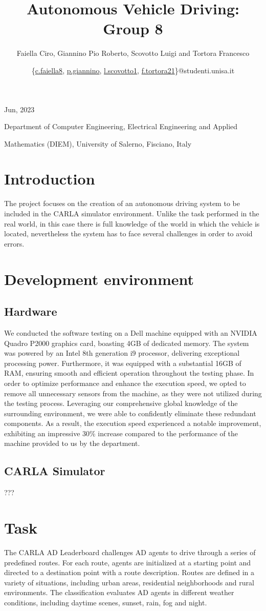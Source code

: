 \documentclass{article}
\title{\textbf{\myfont Autonomous Vehicle Driving: Group 8}}
\author{\small{Faiella Ciro, Giannino Pio Roberto, Scovotto Luigi and Tortora Francesco}}
\date{\small{\{\href{mailto:c.faiella8@studenti.unisa.it}{c.faiella8}, \href{mailto:p.giannino@studenti.unisa.it}{p.giannino}, \href{mailto:l.scovotto1@studenti.unisa.it}{l.scovotto1}, \href{mailto:f.tortora21@studenti.unisa.it}{f.tortora21}\}@studenti.unisa.it}}
\begin{document}
\maketitle
\centerline{\small{Jun, 2023}}
\centerline{Department of Computer Engineering, Electrical Engineering and Applied}
\centerline{Mathematics (DIEM), University of Salerno, Fisciano, Italy}


\section{Introduction}
The project focuses on the creation of an autonomous driving system to be included in the CARLA simulator 
environment. Unlike the task performed in the real world, in this case there is full knowledge of the world 
in which the vehicle is located, nevertheless the system has to face several challenges in order to avoid 
errors. 

\section{Development environment}
\subsection{Hardware}
We conducted the software testing on a Dell machine equipped with an NVIDIA Quadro P2000 graphics card, boasting 4GB of dedicated memory. 
The system was powered by an Intel 8th generation i9 processor, delivering exceptional processing power. Furthermore, it was equipped with a 
substantial 16GB of RAM, ensuring smooth and efficient operation throughout the testing phase.
In order to optimize performance and enhance the execution speed, we opted to remove all unnecessary sensors from the machine, 
as they were not utilized during the testing process. Leveraging our comprehensive global knowledge of the surrounding environment, 
we were able to confidently eliminate these redundant components. 
As a result, the execution speed experienced a notable improvement, exhibiting an impressive 30\% increase compared to the performance of
the machine provided to us by the department.

\subsection{CARLA Simulator}
???

\section{Task}
The CARLA AD Leaderboard challenges AD agents to drive through a series of predefined routes. For each route, 
agents are initialized at a starting point and directed to a destination point with a route description. 
Routes are defined in a variety of situations, including urban areas, residential neighborhoods and rural environments. 
The classification evaluates AD agents in different weather conditions, including daytime scenes, sunset, rain, fog and night.
\end{document}
